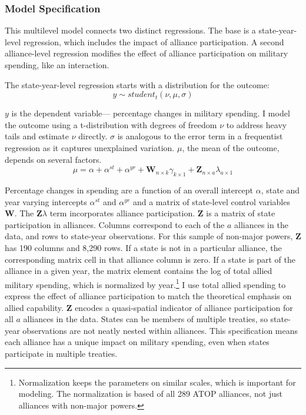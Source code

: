 \documentclass[12pt]{article}
\begin{document}
\subsubsection{Model Specification} 

This multilevel model connects two distinct regressions. 
The base is a state-year-level regression, which includes the impact of alliance participation.
A second alliance-level regression modifies the effect of alliance participation on military spending, like an interaction. 


The state-year-level regression starts with a distribution for the outcome:
\begin{equation}
y \sim student_t(\nu, \mu, \sigma)
\end{equation}
 

$y$ is the dependent variable--- percentage changes in military spending. 
I model the outcome using a t-distribution with degrees of freedom $\nu$ to address heavy tails and estimate $\nu$ directly.
$\sigma$ is analogous to the error term in a frequentist regression as it captures unexplained variation.  
$\mu$, the mean of the outcome, depends on several factors.
\begin{equation}
\mu = \alpha + \alpha^{st} + \alpha^{yr} +\textbf{W}_{n \times k} \gamma_{k \times 1}  + \textbf{Z}_{n \times a} \lambda_{a \times 1} 
\end{equation}


Percentage changes in spending are a function of an overall intercept $\alpha$, state and year varying intercepts $\alpha^{st}$ and $\alpha^{yr}$ and a matrix of state-level control variables $\textbf{W}$.
The $\textbf{Z} \lambda$ term incorporates alliance participation.
$\textbf{Z}$ is a matrix of state participation in alliances. 
Columns correspond to each of the $a$ alliances in the data, and rows to state-year observations. 
For this sample of non-major powers, $\textbf{Z}$ has 190 columns and 8,290 rows. 
If a state is not in a particular alliance, the corresponding matrix cell in that alliance column is zero.
If a state is part of the alliance in a given year, the matrix element contains the log of total allied military spending, which is normalized by year.\footnote{Normalization keeps the parameters on similar scales, which is important for modeling. The normalization is based of all 289 ATOP alliances, not just alliances with non-major powers.} %
I use total allied spending to express the effect of alliance participation to match the theoretical emphasis on allied capability. 
$\textbf{Z}$ encodes a quasi-spatial indicator of alliance participation for all $a$ alliances in the data. 
States can be members of multiple treaties, so state-year observations are not neatly nested within alliances. 
This specification means each alliance has a unique impact on military spending, even when states participate in multiple treaties. 
\end{document}

